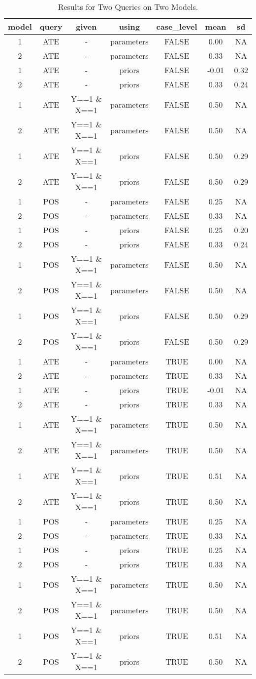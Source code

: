 \documentclass[
  11pt,
  article]{jss}
\begin{document}
\hypertarget{tbl-batch-query}{}
\begin{longtable}{ccccccc}
\caption{\label{tbl-batch-query}Results for Two Queries on Two Models. }\tabularnewline

\toprule
model & query & given & using & case\_level & mean & sd\\
\midrule
1 & ATE & - & parameters & FALSE & 0.00 & NA\\
2 & ATE & - & parameters & FALSE & 0.33 & NA\\
1 & ATE & - & priors & FALSE & -0.01 & 0.32\\
2 & ATE & - & priors & FALSE & 0.33 & 0.24\\
1 & ATE & Y==1 \& X==1 & parameters & FALSE & 0.50 & NA\\
2 & ATE & Y==1 \& X==1 & parameters & FALSE & 0.50 & NA\\
1 & ATE & Y==1 \& X==1 & priors & FALSE & 0.50 & 0.29\\
2 & ATE & Y==1 \& X==1 & priors & FALSE & 0.50 & 0.29\\
1 & POS & - & parameters & FALSE & 0.25 & NA\\
2 & POS & - & parameters & FALSE & 0.33 & NA\\
1 & POS & - & priors & FALSE & 0.25 & 0.20\\
2 & POS & - & priors & FALSE & 0.33 & 0.24\\
1 & POS & Y==1 \& X==1 & parameters & FALSE & 0.50 & NA\\
2 & POS & Y==1 \& X==1 & parameters & FALSE & 0.50 & NA\\
1 & POS & Y==1 \& X==1 & priors & FALSE & 0.50 & 0.29\\
2 & POS & Y==1 \& X==1 & priors & FALSE & 0.50 & 0.29\\
1 & ATE & - & parameters & TRUE & 0.00 & NA\\
2 & ATE & - & parameters & TRUE & 0.33 & NA\\
1 & ATE & - & priors & TRUE & -0.01 & NA\\
2 & ATE & - & priors & TRUE & 0.33 & NA\\
1 & ATE & Y==1 \& X==1 & parameters & TRUE & 0.50 & NA\\
2 & ATE & Y==1 \& X==1 & parameters & TRUE & 0.50 & NA\\
1 & ATE & Y==1 \& X==1 & priors & TRUE & 0.51 & NA\\
2 & ATE & Y==1 \& X==1 & priors & TRUE & 0.50 & NA\\
1 & POS & - & parameters & TRUE & 0.25 & NA\\
2 & POS & - & parameters & TRUE & 0.33 & NA\\
1 & POS & - & priors & TRUE & 0.25 & NA\\
2 & POS & - & priors & TRUE & 0.33 & NA\\
1 & POS & Y==1 \& X==1 & parameters & TRUE & 0.50 & NA\\
2 & POS & Y==1 \& X==1 & parameters & TRUE & 0.50 & NA\\
1 & POS & Y==1 \& X==1 & priors & TRUE & 0.51 & NA\\
2 & POS & Y==1 \& X==1 & priors & TRUE & 0.50 & NA\\
\bottomrule
\end{longtable}
\end{document}
